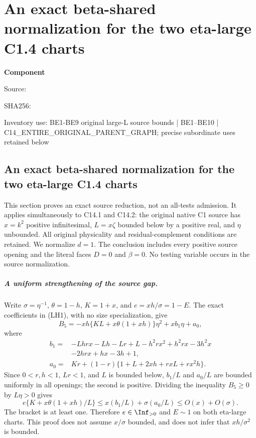 \chapter{An exact beta-shared normalization for the two eta-large C1.4 charts}
\label{component:p10ee3d96a3f1}
\noindent\textbf{Component }\par
{\small\noindent Source: \par}
{\small\noindent SHA256: \par}
{\small\noindent Inventory use: BE1-BE9 original large-L source bounds | BE1--BE10 | C14\_\allowbreak{}ENTIRE\_\allowbreak{}ORIGINAL\_\allowbreak{}PARENT\_\allowbreak{}GRAPH; precise subordinate uses retained below\par}
\medskip
\section{An exact beta-shared normalization for the two eta-large C1.4 charts}
\label{p10ee3d96a3f1:sec:r8-c1-large-eta-source-normalization}
This section proves an exact source reduction, not an all-tests admission.
It applies simultaneously to C14.1 and C14.2: the original native C1
source has $x=k^2$ positive infinitesimal, $L=x\zeta$ bounded below by a
positive real, and $\eta$ unbounded. All original physicality and
residual-complement conditions are retained. We normalize $d=1$.
The conclusion includes every positive source opening and the literal
faces $D=0$ and $\beta=0$. No testing variable occurs in the source
normalization.

\paragraph{A uniform strengthening of the source gap.}
Write $\sigma=\eta^{-1}$, $\theta=1-h$, $K=1+x$, and
$e=xh/\sigma=1-E$. The exact coefficients in (LH1), with no size
specialization, give
\[
 B_5=-xh\{KL+x\theta(1+xh)\}\eta^2+x b_1\eta+a_0,
\]
where
\begin{align*}
 b_1={}&-Lhrx-Lh-Lr+L-h^2rx^2+h^2rx-3h^2x\\
 &-2hrx+hx-3h+1,\\
 a_0={}&Kr+(1-r)\{1+L+2xh+rxL+rx^2h\}.
\end{align*}
Since $0<r,h<1$, $Lr<1$, and $L$ is bounded below,
$b_1/L$ and $a_0/L$ are bounded uniformly in all openings; the second
is positive. Dividing the inequality $B_5\ge0$ by $L\eta>0$ gives
\[
 e\{K+x\theta(1+xh)/L\}
 \le x(b_1/L)+\sigma(a_0/L)\le O(x)+O(\sigma).
 \tag{BE1}
\]
The bracket is at least one. Therefore $e\in\Inf_{>0}$ and $E\sim1$
on both eta-large charts. This proof does not assume $x/\sigma$ bounded,
and does not infer that $xh/\sigma^2$ is bounded.

